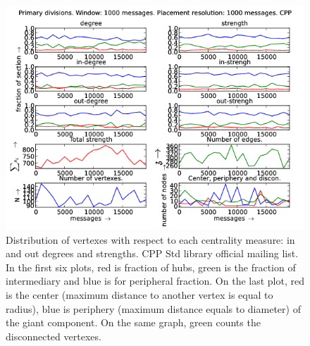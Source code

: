\documentclass[%
 aip,
 jmp,%
 amsmath,amssymb,
 reprint,%
]{revtex4-1}
\begin{document}
\begin{figure}[hbtp] 
   \centering
        \includegraphics[width=\textwidth]{figs/CPP/1000}
    \caption{Distribution of vertexes with respect to each centrality measure: in and out degrees and strengths. CPP Std library official mailing list. In the first six plots, red is fraction of hubs, green is the fraction of intermediary and blue is for peripheral fraction. On the last plot, red is the center (maximum distance to another vertex is equal to radius), blue is periphery (maximum distance equals to diameter) of the giant component. On the same graph, green counts the disconnected vertexes.}
    \label{fig:cpp1000}
\end{figure}
\end{document}
